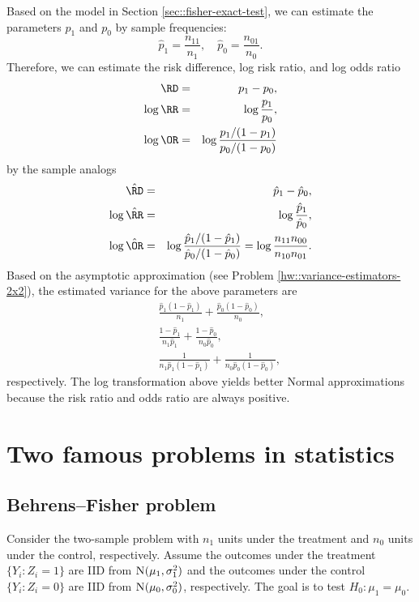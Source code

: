 Based on the model in Section \ref{sec::fisher-exact-test}, we can estimate the parameters $p_1$ and $p_0$ by sample frequencies:
$$
\hat p_1 = \frac{n_{11}}{n_1} ,\quad \hat p_0 = \frac{n_{01}}{n_0}.
$$
Therefore, we can estimate the risk difference, log risk ratio, and log odds ratio 
\begin{eqnarray*}
\RD &=& p_1 - p_0,\\ 
\log \RR &=&\log \frac{ p_1}{p_0},\\ 
\log \OR &=& \log \frac{ p_1/(1-p_1)}{p_0/(1-p_0)}
\end{eqnarray*}
by the sample analogs
\begin{eqnarray*}
\hat \RD &=& \hat  p_1 -\hat  p_0,\\ 
\log \hat \RR &=& \log\frac{ \hat p_1}{\hat p_0},\\ 
\log \hat \OR &=&\log \frac{ \hat p_1/(1-\hat p_1)}{\hat p_0/(1-\hat p_0)}  = \log\frac{n_{11}n_{00}}{n_{10}n_{01}}.
\end{eqnarray*}
Based on the asymptotic approximation (see Problem \ref{hw::variance-estimators-2x2}), the estimated variance for the above parameters are 
\begin{eqnarray*}
&&\frac{ \hat  p_1 (1-\hat  p_1) }{n_1} + \frac{ \hat  p_0 (1-\hat  p_0) }{n_0},\\
&& \frac{   1-\hat  p_1 }{n_1 \hat  p_1} + \frac{   1-\hat  p_0 }{n_0 \hat  p_0 },\\
&& \frac{ 1 }{n_1  \hat  p_1 (1-\hat  p_1)} + \frac{ 1 }{n_0 \hat  p_0 (1-\hat  p_0)},
\end{eqnarray*}
respectively.
The log transformation above yields better Normal approximations because the risk ratio and odds ratio are always positive. 




\section{Two famous problems in statistics}



\subsection{Behrens--Fisher problem}\label{sec::bf-problem}



Consider the two-sample problem with $n_1$ units under the treatment and $n_0$ units under the control, respectively. Assume the outcomes under the treatment $\{  Y_i: Z_i = 1 \}$ are IID from $\textsc{N} (\mu_1, \sigma_1^2)$ and the outcomes under the control  $\{  Y_i: Z_i = 0 \}$ are IID from $\textsc{N} (\mu_0, \sigma_0^2)$, respectively. The goal is to test $H_0: \mu_1 = \mu_0$. 



